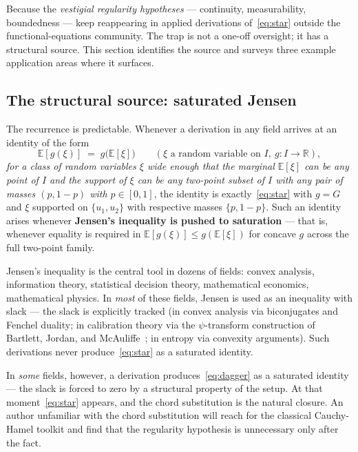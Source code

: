 \documentclass[review,12pt,a4paper]{elsarticle}
\theoremstyle{remark}
\newcommand{\R}{\mathbb R}
\newcommand{\E}{\mathbb E}
\begin{document}
Because the \emph{vestigial regularity hypotheses} --- continuity,
measurability, boundedness --- keep reappearing in applied derivations
of~\eqref{eq:star} outside the functional-equations community. The trap
is not a one-off oversight; it has a structural source. This section
identifies the source and surveys three example application areas where
it surfaces.

\subsection{The structural source: saturated Jensen}
\label{ssec:saturated-jensen}

The recurrence is predictable. Whenever a derivation in any field arrives
at an identity of the form
\begin{equation}
\E[g(\xi)] \;=\; g\bigl(\E[\xi]\bigr)
\qquad (\xi \text{ a random variable on } I,\ g\colon I\to\R),
\tag{$\dagger$}\label{eq:dagger}
\end{equation}
\emph{for a class of random variables $\xi$ wide enough that the marginal
$\E[\xi]$ can be any point of $I$ and the support of $\xi$ can be any
two-point subset of $I$ with any pair of masses $(p,1-p)$ with $p\in[0,1]$},
the identity is exactly~\eqref{eq:star} with $g=G$ and $\xi$ supported on
$\{u_1,u_2\}$ with respective masses $\{p,1-p\}$. Such an identity arises
whenever \textbf{Jensen's inequality is pushed to saturation} --- that is,
whenever equality is required in $\E[g(\xi)]\le g(\E[\xi])$ for concave
$g$ across the full two-point family.

Jensen's inequality is the central tool in dozens of fields: convex
analysis, information theory, statistical decision theory, mathematical
economics, mathematical physics. In \emph{most} of these fields, Jensen is
used as an inequality with slack --- the slack is explicitly tracked
(in convex analysis via biconjugates and Fenchel duality; in calibration
theory via the $\psi$-transform construction of Bartlett, Jordan, and
McAuliffe~\cite{BJM2006}; in entropy via convexity arguments). Such
derivations never produce~\eqref{eq:star} as a saturated identity.

In \emph{some} fields, however, a derivation produces~\eqref{eq:dagger} as
a saturated identity --- the slack is forced to zero by a structural
property of the setup. At that moment~\eqref{eq:star} appears, and the
chord substitution is the natural closure. An author unfamiliar with the
chord substitution will reach for the classical Cauchy-Hamel toolkit and
find that the regularity hypothesis is unnecessary only after the fact.
\end{document}
